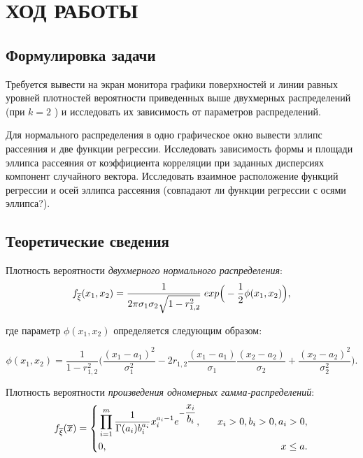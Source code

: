 \section{ХОД РАБОТЫ}

\subsection{Формулировка задачи}

Требуется вывести на экран монитора графики поверхностей и линии равных
уровней плотностей вероятности приведенных выше двухмерных распределений
(при $ k = 2 $ ) и исследовать их зависимость от параметров распределений.

Для нормального распределения в одно графическое окно вывести эллипс
рассеяния и две функции регрессии. Исследовать зависимость формы и
площади эллипса рассеяния от коэффициента корреляции при заданных дисперсиях
компонент случайного вектора. Исследовать взаимное расположение
функций регрессии и осей эллипса рассеяния (совпадают ли функции регрессии
с осями эллипса?).

\subsection{Теоретические сведения}

Плотность вероятности \textit{двухмерного нормального распределения}:
\begin{equation}
    f_{\overline{\xi}}(x_1, x_2) =
    \dfrac{1}{2 \pi \sigma_1 \sigma_2 \sqrt{1-r_{1,2}^2}} \hspace{1mm} exp \Big(-\dfrac{1}{2}\phi(x_1, x_2) \Big),
\end{equation}

\noindent где параметр $ \phi(x_1, x_2) $ определяется следующим образом: 

\begin{equation*}
    \phi(x_1, x_2) = \dfrac{1}{1-r_{1,2}^2}
    \Bigg(
    \dfrac{(x_1 - a_1)^2}{\sigma_1^2} - 
    2r_{1,2} \dfrac{(x_1 - a_1)}{\sigma_1} \dfrac{(x_2 - a_2)}{\sigma_2} +
    \dfrac{(x_2 - a_2)^2}{\sigma_2^2} 
    \Bigg).
\end{equation*}

Плотность вероятности \textit{произведения одномерных гамма-распределений}:
\begin{equation}
    \begin{aligned}
      f_{\overline{\xi}}(\overline{x}) =
      \left\{
        \begin{aligned}
          &\prod_{i=1}^m \dfrac{1}{\Gamma(a_i)b_i^{a_i}} x_i^{a_i-1} e^{-\dfrac{x_i}{b_i}}, \hspace{3mm} &x_i > 0, b_i > 0, a_i > 0, \\
          &0, \hspace{11.5mm} &x \le a.
        \end{aligned}
      \right.
    \end{aligned}
  \end{equation}

